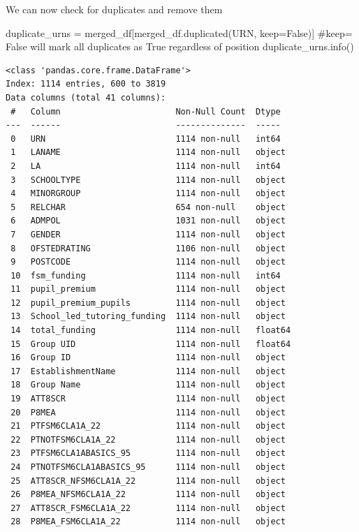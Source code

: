\documentclass[
  letterpaper,
  DIV=11,
  numbers=noendperiod]{scrartcl}
\newenvironment{Shaded}{\begin{snugshade}}{\end{snugshade}}
\newcommand{\CommentTok}[1]{\textcolor[rgb]{0.37,0.37,0.37}{#1}}
\newcommand{\NormalTok}[1]{\textcolor[rgb]{0.00,0.23,0.31}{#1}}
\newcommand{\OperatorTok}[1]{\textcolor[rgb]{0.37,0.37,0.37}{#1}}
\newcommand{\StringTok}[1]{\textcolor[rgb]{0.13,0.47,0.30}{#1}}
\newcommand{\VariableTok}[1]{\textcolor[rgb]{0.07,0.07,0.07}{#1}}
\begin{document}
We can now check for duplicates and remove them

\begin{Shaded}
\begin{Highlighting}[]
\NormalTok{duplicate\_urns }\OperatorTok{=}\NormalTok{ merged\_df[merged\_df.duplicated(}\StringTok{\textquotesingle{}URN\textquotesingle{}}\NormalTok{, keep}\OperatorTok{=}\VariableTok{False}\NormalTok{)] }
\CommentTok{\#keep= False will mark all duplicates as True regardless of position}
\NormalTok{duplicate\_urns.info()}
\end{Highlighting}
\end{Shaded}

\begin{verbatim}
<class 'pandas.core.frame.DataFrame'>
Index: 1114 entries, 600 to 3819
Data columns (total 41 columns):
 #   Column                       Non-Null Count  Dtype  
---  ------                       --------------  -----  
 0   URN                          1114 non-null   int64  
 1   LANAME                       1114 non-null   object 
 2   LA                           1114 non-null   int64  
 3   SCHOOLTYPE                   1114 non-null   object 
 4   MINORGROUP                   1114 non-null   object 
 5   RELCHAR                      654 non-null    object 
 6   ADMPOL                       1031 non-null   object 
 7   GENDER                       1114 non-null   object 
 8   OFSTEDRATING                 1106 non-null   object 
 9   POSTCODE                     1114 non-null   object 
 10  fsm_funding                  1114 non-null   int64  
 11  pupil_premium                1114 non-null   object 
 12  pupil_premium_pupils         1114 non-null   object 
 13  School_led_tutoring_funding  1114 non-null   object 
 14  total_funding                1114 non-null   float64
 15  Group UID                    1114 non-null   float64
 16  Group ID                     1114 non-null   object 
 17  EstablishmentName            1114 non-null   object 
 18  Group Name                   1114 non-null   object 
 19  ATT8SCR                      1114 non-null   object 
 20  P8MEA                        1114 non-null   object 
 21  PTFSM6CLA1A_22               1114 non-null   object 
 22  PTNOTFSM6CLA1A_22            1114 non-null   object 
 23  PTFSM6CLA1ABASICS_95         1114 non-null   object 
 24  PTNOTFSM6CLA1ABASICS_95      1114 non-null   object 
 25  ATT8SCR_NFSM6CLA1A_22        1114 non-null   object 
 26  P8MEA_NFSM6CLA1A_22          1114 non-null   object 
 27  ATT8SCR_FSM6CLA1A_22         1114 non-null   object 
 28  P8MEA_FSM6CLA1A_22           1114 non-null   object 

\end{verbatim}
\end{document}
